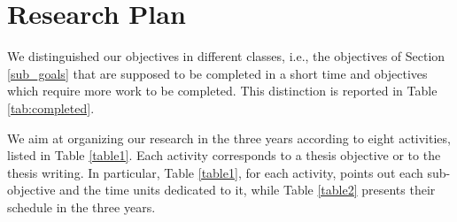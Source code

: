 \section{Research Plan}\label{researchplan}
We distinguished our objectives in different classes, i.e., the objectives of Section \ref{sub_goals} that are supposed to be completed in a short time and objectives which require more work to be completed. This distinction is reported in Table \ref{tab:completed}.

We aim at organizing our research in the three years according to eight activities, listed in Table \ref{table1}. Each activity corresponds to a thesis objective or to the thesis writing. In particular, Table \ref{table1}, for each activity, points out each sub-objective and the time units dedicated to it, while Table \ref{table2} presents their schedule in the three years.






